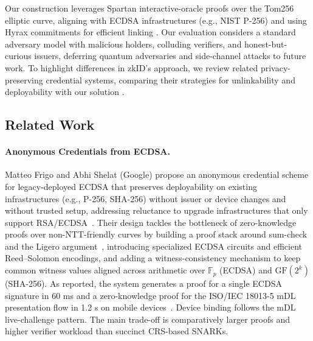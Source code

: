 Our construction leverages Spartan interactive-oracle proofs over the Tom256 elliptic curve, aligning with ECDSA infrastructures (e.g., NIST P-256) and using Hyrax commitments for efficient linking \cite{C:Setty20,cryptoeprint:2017/1132}. Our evaluation considers a standard adversary model with malicious holders, colluding verifiers, and honest-but-curious issuers, deferring quantum adversaries and side-channel attacks to future work. To highlight differences in zkID’s approach, we review related privacy-preserving credential systems, comparing their strategies for unlinkability and deployability with our solution \cite{cryptoeprint:2024/2010,cryptoeprint:2024/2013}.

\subsection{Related Work}

\paragraph{Anonymous Credentials from ECDSA.}
Matteo Frigo and Abhi Shelat (Google) propose an anonymous credential scheme for legacy-deployed ECDSA that preserves deployability on existing infrastructures (e.g., P-256, SHA-256) without issuer or device changes and without trusted setup, addressing reluctance to upgrade infrastructures that only support RSA/ECDSA~\cite{cryptoeprint:2024/2010}. Their design tackles the bottleneck of zero-knowledge proofs over non-NTT-friendly curves by building a proof stack around sum-check and the Ligero argument~\cite{CCS:AHIV17}, introducing specialized ECDSA circuits and efficient Reed–Solomon encodings, and adding a witness-consistency mechanism to keep common witness values aligned across arithmetic over $\mathbb{F}_{p}$ (ECDSA) and $\mathrm{GF}(2^k)$ (SHA-256). As reported, the system generates a proof for a single ECDSA signature in 60 ms and a zero-knowledge proof for the ISO/IEC 18013-5 mDL presentation flow in 1.2 s on mobile devices~\cite[\S5.3,\S6.2]{cryptoeprint:2024/2010}. Device binding follows the mDL live-challenge pattern. The main trade-off is comparatively larger proofs and higher verifier workload than succinct CRS-based SNARKs.

